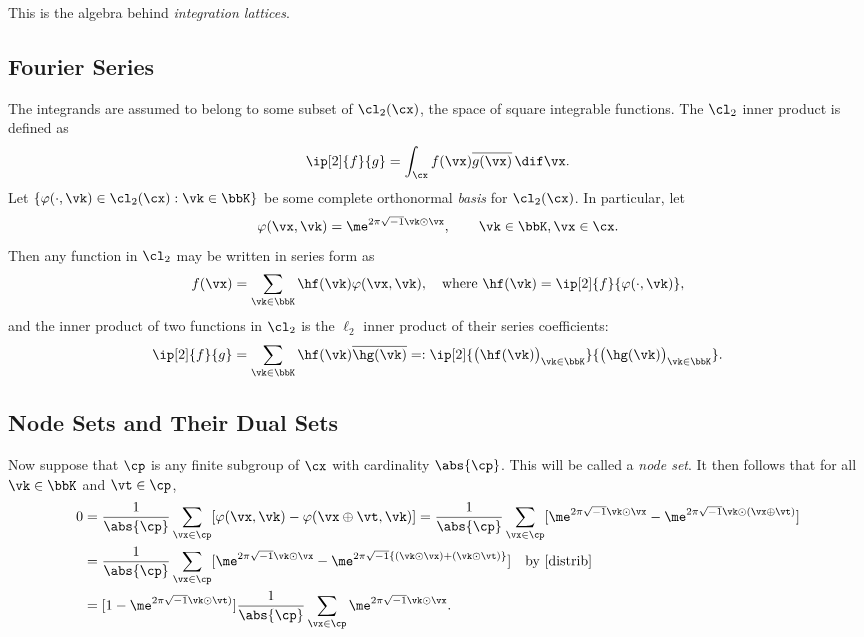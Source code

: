 \documentclass[]{elsarticle}
\theoremstyle{definition}
\theoremstyle{remark}
\begin{document}
This is the algebra behind \emph{integration lattices}.

\subsection{Fourier Series}

The integrands are assumed to belong to some subset of $\cl_2(\cx)$, the space of square integrable functions.  The $\cl_2$ inner product is defined as
\[
\ip[2]{f}{g} = \int_{\cx} f(\vx) \overline{g(\vx)} \, \dif \vx.
\]
Let $\{\varphi(\cdot,\vk) \in \cl_2(\cx) : \vk \in \bbK\}$ be some complete orthonormal \emph{basis} for $\cl_2(\cx)$. In particular, let
\[
\varphi(\vx,\vk)  = \me^{2 \pi \sqrt{-1} \vk \odot \vx}, \qquad \vk \in \bbK, \vx \in \cx.
\]
Then any function in $\cl_2$ may be written in series form as
\begin{equation} \label{Fourierdef}
f(\vx) = \sum_{\vk \in \bbK} \hf(\vk) \varphi(\vx,\vk), \quad \text{where } \hf(\vk) = \ip[2]{f}{\varphi(\cdot,\vk)},
\end{equation}
and the inner product of two functions in $\cl_2$ is the $\ell_2$ inner product of their series coefficients:
\[
\ip[2]{f}{g} = \sum_{\vk \in \bbK} \hf(\vk)\overline{\hg(\vk)} =: \ip[2]{\bigl(\hf(\vk)\bigr)_{\vk \in \bbK}}{\bigl ( \hg(\vk)\bigr )_{\vk \in \bbK}}.
\]

\subsection{Node Sets and Their Dual Sets} Now suppose that $\cp$ is any finite subgroup of $\cx$ with cardinality $\abs{\cp}$.  This will be called a \emph{node set}.  It then follows that for all $\vk \in \bbK$ and $\vt \in \cp$,
\begin{align}
\nonumber
0 & = \frac{1}{\abs{\cp}} \sum_{\vx \in \cp} [\varphi(\vx,\vk) - \varphi(\vx \oplus \vt,\vk)]  = \frac{1}{\abs{\cp}} \sum_{\vx \in \cp} [\me^{2 \pi \sqrt{-1} \vk \odot \vx} - \me^{2 \pi \sqrt{-1} \vk \odot (\vx \oplus \vt)}]\\
\nonumber
& = \frac{1}{\abs{\cp}} \sum_{\vx \in \cp} [\me^{2 \pi \sqrt{-1} \vk \odot \vx} - \me^{2 \pi \sqrt{-1} \{(\vk \odot \vx) + (\vk \odot\vt)\}}] \quad \text{by } \eqref{distrib}\\
\label{sumeq}
& = [1 - \me^{2 \pi \sqrt{-1} \vk \odot\vt)}] \frac{1}{\abs{\cp}} \sum_{\vx \in \cp} \me^{2 \pi \sqrt{-1} \vk \odot \vx}.
\end{align}
\end{document}
